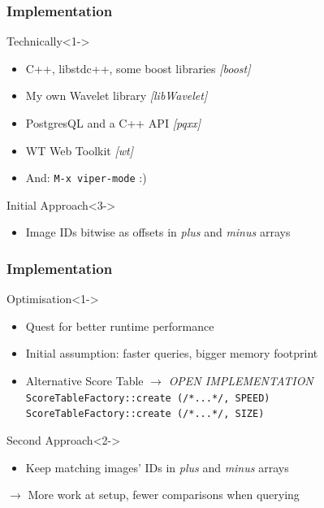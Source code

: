 \documentclass{beamer}
\newcommand\rarrow{$\longrightarrow$ } %
\begin{document}
\begin{frame}
  \frametitle{Implementation}

  \begin{block}{Technically}<1->
    \begin{itemize}
    \item C++, libstdc++, some boost libraries \emph{[boost]}
    \item My own Wavelet library \emph{[libWavelet]}
    \item PostgresQL and a C++ API \emph{[pqxx]}
    \item WT Web Toolkit \emph{[wt]}
      \pause
    \item And: \texttt{M-x viper-mode} :)
    \end{itemize}
  \end{block}

  \begin{block}{Initial Approach}<3->
    \begin{itemize}
    \item Image IDs bitwise as offsets in \emph{plus} and \emph{minus} arrays
    \end{itemize}
  \end{block}
\end{frame}

\begin{frame}
  \frametitle{Implementation}

  \begin{block}{Optimisation}<1->
    \begin{itemize}
    \item Quest for better runtime performance
    \item Initial assumption: faster queries, bigger memory footprint
    \item Alternative Score Table \rarrow \emph{OPEN IMPLEMENTATION}\\
      \texttt{ScoreTableFactory::create (/*...*/, SPEED)}\\
      \texttt{ScoreTableFactory::create (/*...*/, SIZE)}\\
    \end{itemize}
  \end{block}

  \begin{block}{Second Approach}<2->
    \begin{itemize}
    \item Keep matching images' IDs in \emph{plus} and \emph{minus} arrays
    \end{itemize}
  \end{block}

  \pause
  \rarrow More work at setup, fewer comparisons when querying
\end{frame}
\end{document}
